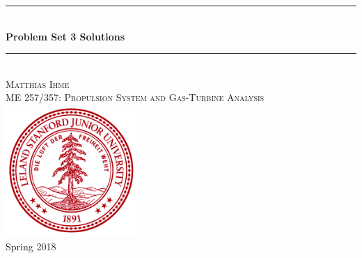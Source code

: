 \documentclass[12pt]{article}
\begin{document}

\begin{titlepage}

\newcommand{\ddz}[1]{\frac{\mathrm{d} #1}{\mathrm{d} z}}
\newcommand{\HRule}{\rule{\linewidth}{0.5mm}} %

\center %
 

 




\HRule \\[1 cm]
{ \huge \bfseries Problem Set 3 Solutions}\\[0.4cm] %
\HRule \\[2cm]
 

\Large  \textsc{Matthias Ihme}\\[2cm] %
\textsc{\large ME 257/357: Propulsion System and Gas-Turbine Analysis}\\[2cm] %

\includegraphics[width=50mm]{stanford_seal.png}\\[2cm] %
{\large Spring 2018}%


\end{titlepage}
\end{document}
